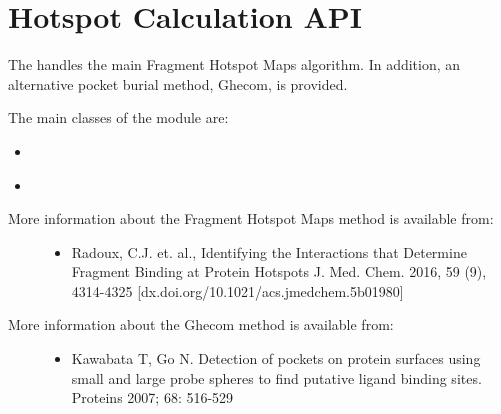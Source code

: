 \documentclass[letterpaper,10pt,english]{sphinxmanual}
\begin{document}
\chapter{Hotspot Calculation API}
\label{\detokenize{calculation_api:module-hotspots.calculation}}\label{\detokenize{calculation_api:hotspot-calculation-api}}\label{\detokenize{calculation_api::doc}}
The {\hyperref[\detokenize{calculation_api:module-hotspots.calculation}]{}} handles the main Fragment Hotspot Maps algorithm. In addition, an alternative pocket burial method, Ghecom, is provided.

The main classes of the {\hyperref[\detokenize{calculation_api:module-hotspots.calculation}]{}} module are:
\begin{itemize}
\item {} 
{\hyperref[\detokenize{calculation_api:hotspots.calculation.Buriedness}]{}}

\item {} 
{\hyperref[\detokenize{calculation_api:hotspots.calculation.Runner}]{}}

\end{itemize}
\begin{description}
\item[{More information about the Fragment Hotspot Maps method is available from:}] \leavevmode\begin{itemize}
\item {} 
Radoux, C.J. et. al., Identifying the Interactions that Determine Fragment Binding at Protein Hotspots J. Med. Chem. 2016, 59 (9), 4314-4325 {[}dx.doi.org/10.1021/acs.jmedchem.5b01980{]}

\end{itemize}

\item[{More information about the Ghecom method is available from:}] \leavevmode\begin{itemize}
\item {} 
Kawabata T, Go N. Detection of pockets on protein surfaces using small and large probe spheres to find putative ligand binding sites. Proteins 2007; 68: 516-529

\end{itemize}

\end{description}
\end{document}
